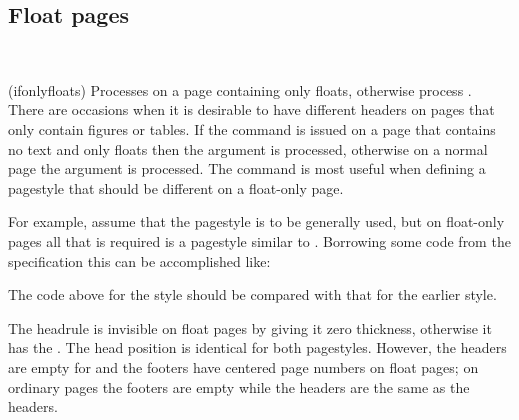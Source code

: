 
\subsection{Float pages}


\begin{syntax}
 \\
\end{syntax}
\glossary(ifonlyfloats)%
  {}%
  {Processes  on a page containing only floats, otherwise process
  .}
    There are occasions when it is desirable to have different 
headers on pages that only contain figures 
or tables. If the command 
is issued on a page that contains no text and only floats then the 
argument is processed, otherwise on a normal page the  argument
is processed. The command is most useful when defining a pagestyle that 
should be different on a float-only page.

    For example, assume that the  pagestyle is to be
generally used, but on float-only pages all that is required is a pagestyle
similar to . Borrowing some code from the 
specification this can be accomplished like:
\begin{lcode}
%
  {\ifonlyfloats{0pt}{\normalrulethickness}}
%
             {\ifonlyfloats{}{\normalfont\bfseries\thepage}}%
             {}%
             {\ifonlyfloats{}{\normalfont\bfseries\leftmark}}
%
             {\ifonlyfloats{}{\normalfont\bfseries\rightmark}}%
             {}%
             {\ifonlyfloats{}{\normalfont\bfseries\thepage}}
\end{lcode}
The code above for the  style should be compared with 
that for the earlier  style.

    The headrule is invisible 
on float pages by giving it zero thickness, 
otherwise it has the \cmd{\normalrulethickness}. The head position is 
identical for both pagestyles. However, the headers are empty for
 and the footers have centered page numbers 
on float pages; on ordinary pages the footers are empty 
while the headers
are the same as the  headers.

